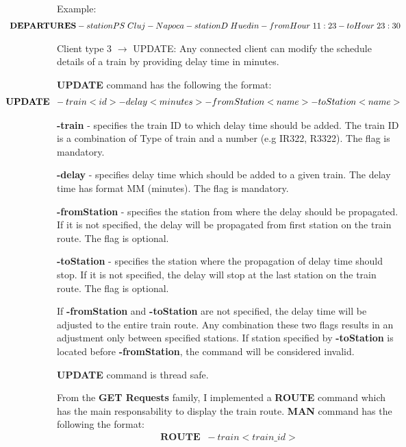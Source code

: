 \documentclass[runningheads]{llncs}
\begin{document}
\par Example:
\begin{gather*}
   \hspace*{-2cm}\textbf{DEPARTURES}  -stationPS  \; Cluj-Napoca -stationD  \; Huedin -fromHour \; 11:23 -toHour \; 23:30
\end{gather*}

\par Client type 3 $\rightarrow$ UPDATE: Any connected client can modify the schedule details of a train by providing delay time in minutes.

\textbf{UPDATE} command has the following the format:  
\begin{gather*}
   \hspace*{-2cm}\textbf{UPDATE} \;\;-train <id> -delay <minutes> -fromStation <name> -toStation <name>
\end{gather*}

\textbf{-train} - specifies the train ID to which delay time should be added. The train ID is a combination of Type of train and a number (e.g IR322, R3322). The flag is mandatory.

\textbf{-delay} - specifies delay time which should be added to a given train. The delay time has format MM (minutes). The flag is mandatory.

\textbf{-fromStation} - specifies the station from where the delay should be propagated. If it is not specified, the delay will be propagated from first station on the train route. The flag is optional.

\textbf{-toStation} - specifies the station where the propagation of delay time should stop. If it is not specified, the delay will stop at the last station on the train route. The flag is optional.

If \textbf{-fromStation} and \textbf{-toStation} are not specified, the delay time will be adjusted to the entire train route. Any combination these two flags results in an adjustment only between specified stations. If station specified by  \textbf{-toStation} is located before \textbf{-fromStation}, the command will be considered invalid.

\textbf{UPDATE} command is thread safe.

From the \textbf{GET Requests} family, I implemented a \textbf{ROUTE} command which has the main responsability to display the train route.
\textbf{MAN} command has the following the format:  
\begin{gather*}
    \textbf{ROUTE} \;\;-train <train\_id>
\end{gather*}
\end{document}
